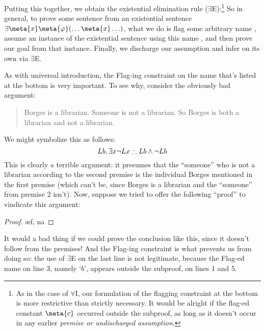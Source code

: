 Putting this together, we obtain the existential elimination rule ($\exists$E):\footnote{As in the case of $\forall$I, our formulation of the flagging constraint at the bottom is more restrictive than strictly necessary.  It would be alright if the flag-ed constant $\meta{c}$ occurred outside the subproof, as long as it doesn't occur in any earlier \emph{premise or undischarged assumption}.}
So in general, to prove some sentence \meta{\psi} from an existential sentence $\exists \meta{x}\meta{\varphi}(\ldots \meta{x} \ldots)$, what we do is flag some arbitrary name , assume an instance of the existential sentence using this name , and then prove our goal \meta{\psi} from that instance.  Finally, we discharge our assumption and infer \meta{\psi} on its own via $\exists$E.

As with universal introduction, the Flag-ing constraint on the name  that's listed at the bottom is very important. To see why, consider the obviously bad argument:
	\begin{quote}
		Borges is a librarian. Someone is not a librarian. So Borges is both a librarian and not a librarian. 	\end{quote}
We might symbolize this as follows:
$$Lb, \exists x \neg Lx \therefore Lb \wedge \neg Lb$$
This is clearly a terrible argument: it presumes that the ``someone'' who is not a librarian according to the second premise is the individual Borges mentioned in the first premise (which can't be, since Borges is a librarian and the ``someone'' from premise 2 isn't).  Now, suppose we tried to offer the following ``proof'' to vindicate this argument:
\begin{proof}
	 
	 
	\open
		 
		\ae{f, na}
	\close
\end{proof}
It would a bad thing if we could prove the conclusion like this, since it doesn't follow from the premises!  And the Flag-ing constraint is what prevents us from doing so:  the use of $\exists$E on the last line is not legitimate, because the Flag-ed name on line 3, namely `$b$', appears outside the subproof, on lines 1 and 5.


